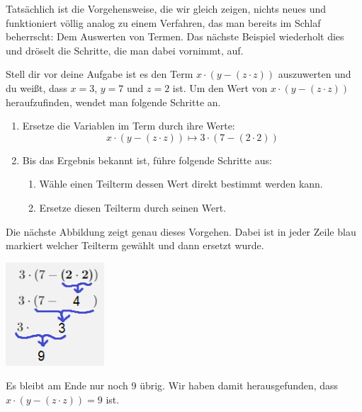 \documentclass[../../main.tex]{subfiles}
\begin{document}
Tatsächlich ist die Vorgehensweise, die wir gleich zeigen, nichts neues und funktioniert völlig analog zu einem Verfahren, das man bereits im Schlaf beherrscht: Dem Auswerten von Termen. Das nächste Beispiel wiederholt dies und dröselt die Schritte, die man dabei vornimmt, auf.

\begin{example}
Stell dir vor deine Aufgabe ist es den Term $x \cdot (y - (z \cdot z))$ auszuwerten und du weißt, dass $x = 3$, $y = 7$ und  $z = 2$ ist.
Um den Wert von $x \cdot (y - (z \cdot z))$ heraufzufinden, wendet man folgende Schritte an.
\begin{enumerate}
    \item Ersetze die Variablen im Term durch ihre Werte:
    \[x \cdot (y - (z \cdot z)) \longmapsto 3 \cdot (7 - (2 \cdot 2)) \]
    \item Bis das Ergebnis bekannt ist, führe folgende Schritte aus:
        \begin{enumerate}
            \item Wähle einen Teilterm dessen Wert direkt bestimmt werden kann.
            \item Ersetze diesen Teilterm durch seinen Wert.
        \end{enumerate}
    \end{enumerate}
    
    Die nächste Abbildung zeigt genau dieses Vorgehen. Dabei ist in jeder Zeile blau markiert welcher Teilterm gewählt und dann ersetzt wurde.
    \begin{center}
        \includegraphics[width=0.275\textwidth]{images/TEMP_termalg.png}
    \end{center}

    Es bleibt am Ende nur noch 9 übrig. Wir haben damit herausgefunden, dass $x \cdot (y - (z \cdot z)) = 9$ ist.

\end{example}
\end{document}
